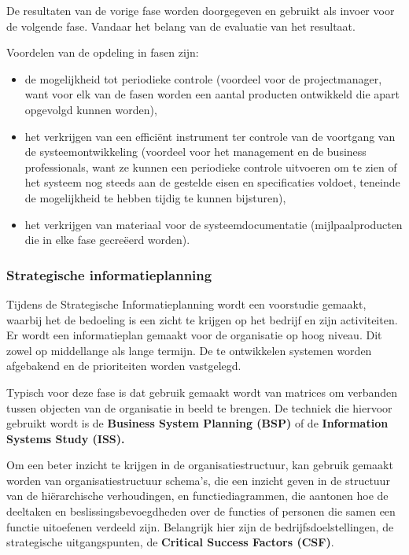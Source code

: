 De resultaten van de vorige fase worden doorgegeven en gebruikt als invoer voor de volgende fase. Vandaar het belang van de evaluatie van het resultaat.

Voordelen van de opdeling in fasen zijn:

\begin{itemize}
    \item de mogelijkheid tot periodieke controle (voordeel voor de projectmanager, want voor elk van de fasen worden een aantal producten ontwikkeld die apart opgevolgd kunnen worden),
    \item het verkrijgen van een efficiënt instrument ter controle van de voortgang van de systeemontwikkeling (voordeel voor het management en de business professionals, want ze kunnen een periodieke controle uitvoeren om te zien of het systeem nog steeds aan de gestelde eisen en specificaties voldoet, teneinde de mogelijkheid te hebben tijdig te kunnen bijsturen),
    \item het verkrijgen van materiaal voor de systeemdocumentatie (mijlpaalproducten die in elke fase gecreëerd worden).
\end{itemize}
\newpage
\subsubsection{Strategische informatieplanning}

Tijdens de Strategische Informatieplanning wordt een voorstudie gemaakt, waarbij het de bedoeling is een zicht te krijgen op het bedrijf en zijn activiteiten. Er wordt een informatieplan gemaakt voor de organisatie op hoog niveau. Dit zowel op middellange als lange termijn. De te ontwikkelen systemen worden afgebakend en de prioriteiten worden vastgelegd.

Typisch voor deze fase is dat gebruik gemaakt wordt van matrices om verbanden tussen objecten van de organisatie in beeld te brengen. De techniek die hiervoor gebruikt wordt is de \textbf{Business System Planning (BSP)} of de \textbf{Information Systems Study (ISS).}

Om een beter inzicht te krijgen in de organisatiestructuur, kan gebruik gemaakt worden van organisatiestructuur schema's, die een inzicht geven in de structuur van de hiërarchische verhoudingen, en functiediagrammen, die aantonen hoe de deeltaken en beslissingsbevoegdheden over de functies of personen die samen een functie uitoefenen verdeeld zijn. Belangrijk hier zijn de bedrijfsdoelstellingen, de strategische uitgangspunten, de \textbf{Critical Success Factors (CSF)}.

